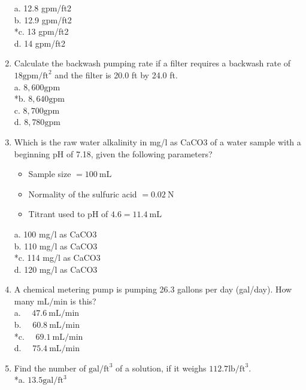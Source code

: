 \begin{enumerate}
\begin{itemize}
\end{itemize}
a. 12.8 gpm/ft2\\
b. 12.9 gpm/ft2\\
*c. 13 gpm/ft2\\
d. 14 gpm/ft2\\
\item Calculate the backwash pumping rate if a filter requires a backwash rate of $18 \mathrm{gpm} / \mathrm{ft}^{2}$ and the filter is 20.0 ft by 24.0 ft.\\
a. $8,600 \mathrm{gpm}$\\
*b. $8,640 \mathrm{gpm}$\\
c. $8,700 \mathrm{gpm}$\\
d. $8,780 \mathrm{gpm}$ \\
\item Which is the raw water alkalinity in mg/l as CaCO3 of a water sample with a beginning pH of 7.18, given the following parameters?\\
\begin{itemize}
\item Sample size $=100 \mathrm{~mL}$\\
\item Normality of the sulfuric acid $=0.02 \mathrm{~N}$\\
\item Titrant used to pH of $4.6=11.4 \mathrm{~mL}$\\
\end{itemize}
a. 100 mg/l as CaCO3\\
b. 110 mg/l as CaCO3\\
*c. 114 mg/l as CaCO3\\
d. 120 mg/l as CaCO3\\
\item A chemical metering pump is pumping 26.3 gallons per day (gal/day). How many $\mathrm{mL} / \mathrm{min}$ is this?\\
a. $\quad 47.6 \mathrm{~mL} / \mathrm{min}$\\
b. $\quad 60.8 \mathrm{~mL} / \mathrm{min}$\\
*c. $\quad 69.1 \mathrm{~mL} / \mathrm{min}$\\
d. $\quad 75.4 \mathrm{~mL} / \mathrm{min}$\\
\item Find the number of $\mathrm{gal} / \mathrm{ft}^{3}$ of a solution, if it weighs $112.7 \mathrm{lb} / \mathrm{ft}^{3}$.\\
*a. $13.5 \mathrm{gal} / \mathrm{ft}^{3}$\\

\end{enumerate}
